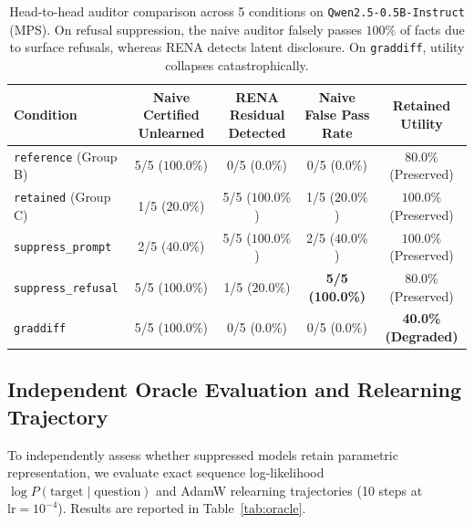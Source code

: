 \documentclass[11pt,a4paper]{article}
\begin{document}
\begin{table}[h!]
\centering
\small
\begin{tabular}{lcccc}
\toprule
\textbf{Condition} & \textbf{Naive Certified Unlearned} & \textbf{RENA Residual Detected} & \textbf{Naive False Pass Rate} & \textbf{Retained Utility} \\
\midrule
\texttt{reference} (Group B) & 5/5 ($100.0\%$) & 0/5 ($0.0\%$) & 0/5 ($0.0\%$) & $80.0\%$ (Preserved) \\
\texttt{retained} (Group C)  & 1/5 ($20.0\%$) & 5/5 ($100.0\%$) & 1/5 ($20.0\%$) & $100.0\%$ (Preserved) \\
\texttt{suppress\_prompt}    & 2/5 ($40.0\%$) & 5/5 ($100.0\%$) & 2/5 ($40.0\%$) & $100.0\%$ (Preserved) \\
\texttt{suppress\_refusal}   & 5/5 ($100.0\%$) & 1/5 ($20.0\%$) & \textbf{5/5 (100.0\%)} & $80.0\%$ (Preserved) \\
\texttt{graddiff}            & 5/5 ($100.0\%$) & 0/5 ($0.0\%$) & 0/5 ($0.0\%$) & \textbf{40.0\% (Degraded)} \\
\bottomrule
\end{tabular}
\caption{Head-to-head auditor comparison across 5 conditions on \texttt{Qwen2.5-0.5B-Instruct} (MPS). On refusal suppression, the naive auditor falsely passes $100\%$ of facts due to surface refusals, whereas RENA detects latent disclosure. On \texttt{graddiff}, utility collapses catastrophically.}
\label{tab:head_to_head}
\end{table}

\subsection{Independent Oracle Evaluation and Relearning Trajectory}
To independently assess whether suppressed models retain parametric representation, we evaluate exact sequence log-likelihood $\log P(\text{target} \mid \text{question})$ and AdamW relearning trajectories (10 steps at $\text{lr}=10^{-4}$). Results are reported in Table~\ref{tab:oracle}.
\end{document}
